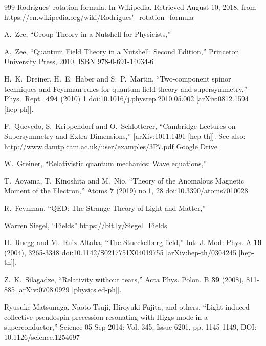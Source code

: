 \begin{thebibliography}{999}
 Rodrigues' rotation formula. In Wikipedia. Retrieved August 10, 2018, from \url{https://en.wikipedia.org/wiki/Rodrigues'_rotation_formula}


  A.~Zee,
  ``Group Theory in a Nutshell for Physicists,''

A.~Zee,
``Quantum Field Theory in a Nutshell: Second Edition,''
Princeton University Press, 2010,
ISBN 978-0-691-14034-6

  H.~K.~Dreiner, H.~E.~Haber and S.~P.~Martin,
  ``Two-component spinor techniques and Feynman rules for quantum field theory and supersymmetry,''
  Phys.\ Rept.\  {\bf 494} (2010) 1
  doi:10.1016/j.physrep.2010.05.002
  [arXiv:0812.1594 [hep-ph]].


F.~Quevedo, S.~Krippendorf and O.~Schlotterer,
``Cambridge Lectures on Supersymmetry and Extra Dimensions,''
[arXiv:1011.1491 [hep-th]].
See also: \url{http://www.damtp.cam.ac.uk/user/examples/3P7.pdf}
\href{https://drive.google.com/file/d/1HpTXflJToqHr6cEa2b3IkWQ8E1MTjp_v/view?usp=sharing}{Google Drive}

W.~Greiner,
``Relativistic quantum mechanics: Wave equations,''

T.~Aoyama, T.~Kinoshita and M.~Nio,
``Theory of the Anomalous Magnetic Moment of the Electron,''
Atoms \textbf{7} (2019) no.1, 28
doi:10.3390/atoms7010028


R.~Feynman,
``QED: The Strange Theory of Light and Matter,''

  Warren Siegel, ``Fields'' \url{https://bit.ly/Siegel_Fields}

%
H.~Ruegg and M.~Ruiz-Altaba,
``The Stueckelberg field,''
Int. J. Mod. Phys. A \textbf{19} (2004), 3265-3348
doi:10.1142/S0217751X04019755
[arXiv:hep-th/0304245 [hep-th]].

Z.~K.~Silagadze,
``Relativity without tears,''
Acta Phys. Polon. B \textbf{39} (2008), 811-885
[arXiv:0708.0929 [physics.ed-ph]].


Ryusuke Matsunaga, Naoto Tsuji, Hiroyuki Fujita, and others, ``Light-induced collective pseudospin precession resonating with Higgs mode in a superconductor,''
Science  05 Sep 2014:
Vol. 345, Issue 6201, pp. 1145-1149, DOI: 10.1126/science.1254697
\end{thebibliography}




